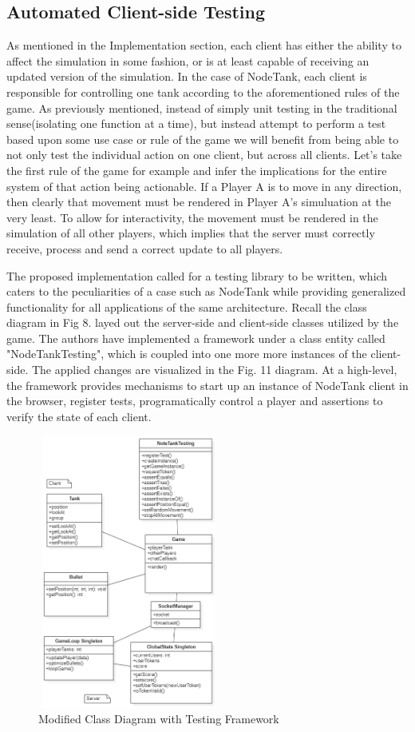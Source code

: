 \documentclass[conference]{IEEEtran}
\begin{document}
\subsection{Automated Client-side Testing}

As mentioned in the Implementation section, each client has either the ability to affect the simulation in some fashion, or is at least capable of receiving an updated
version of the simulation. In the case of NodeTank, each client is responsible for controlling one tank according to the aforementioned rules of the game. As previously mentioned,
instead of simply unit testing in the traditional sense(isolating one function at a time), but instead attempt to perform a test based upon some use case or rule of the game we will
 benefit from being able to not only test the individual action on one client, but across all clients. Let's take the first rule of the game for example and infer the implications for the entire system 
 of that action being actionable. If a Player A is to move in any direction, then clearly that movement must be rendered in Player A's simuluation at the very least. To allow for interactivity, 
 the movement must be rendered in the simulation of all other players, which implies that the server must correctly receive, process and send a correct update to all players. 
 
 The proposed implementation called for a testing library to be written, which caters to the peculiarities of a case such as NodeTank while providing generalized functionality for all 
 applications of the same architecture. Recall the class diagram in Fig 8. layed out the server-side and client-side classes utilized by the game. The authors have implemented a framework
 under a class entity called "NodeTankTesting", which is coupled into one more more instances of the client-side. The applied changes are visualized in the Fig. 11 diagram. At a high-level,
 the framework provides mechanisms to start up an instance of NodeTank client in the browser, register tests, programatically control a player and assertions to verify the state of each client. 

\begin{figure}[htbp]
\centerline{\includegraphics [width = 6cm, height = 9cm] {classv2.PNG}}
\caption{Modified Class Diagram with Testing Framework}
\end{figure}
\end{document}
